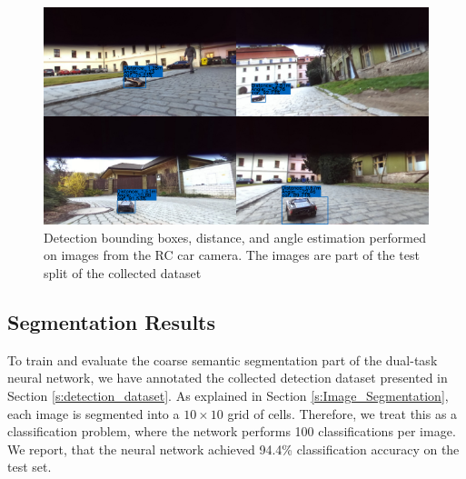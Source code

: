 \documentclass{ctuthesis/ctuthesis}
\begin{document}
\begin{figure}[]
    \centering
    \includegraphics[width=1\textwidth]{images/detection_collage.pdf}
    
    \caption[Detection bounding boxes, distance, and angle estimation performed on images from the RC car camera]{Detection bounding boxes, distance, and angle estimation performed on images from the RC car camera. The images are part of the test split of the collected dataset}\label{f:detection_images}
\end{figure}



\subsection{Segmentation Results}
To train and evaluate the coarse semantic segmentation part of the dual-task neural network, we have annotated the collected detection dataset presented in Section \ref{s:detection_dataset}. As explained in Section \ref{s:Image_Segmentation}, each image is segmented into a $10\times 10$ grid of cells. Therefore, we treat this as a classification problem, where the network performs 100 classifications per image. We report, that the neural network achieved 94.4\% classification accuracy on the test set.
\end{document}

